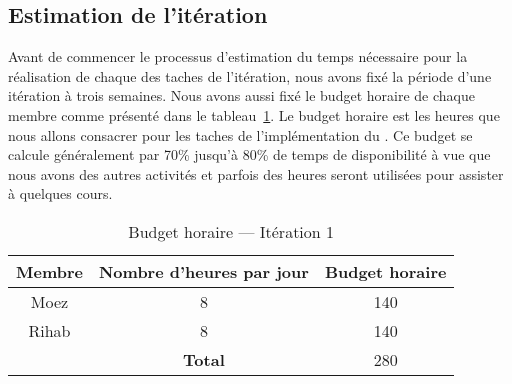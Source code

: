 
\subsection{Estimation de l'itération}

Avant de commencer le processus d'estimation du temps nécessaire pour la
réalisation de chaque des taches de l'itération, nous avons fixé la période
d'une itération à trois semaines. Nous avons aussi fixé le budget horaire de
chaque membre comme présenté dans le tableau~\ref{tab:sprint1-capacity}. Le
budget horaire est les heures que nous allons consacrer pour les taches de
l'implémentation du . Ce budget se calcule généralement
par 70\% jusqu'à 80\% de temps de disponibilité à 
vue que nous avons des autres activités et parfois des heures seront utilisées
pour assister à quelques cours.

\begin{table}[H]
    \centering
    \begin{tabular}{| c | c | c |}
        \hline
        \textbf{Membre} & \textbf{Nombre d'heures par jour} & \textbf{Budget horaire} \\ \hline
        \hline

Moez & 8 & 140\\ \hline
Rihab & 8 & 140 \\ \hline
\multicolumn{1}{c|}{} & \textbf{Total} & 280 \\ \cline{2-3}
    \end{tabular}
    \caption{Budget horaire --- Itération 1}
\label{tab:sprint1-capacity}
\end{table}

